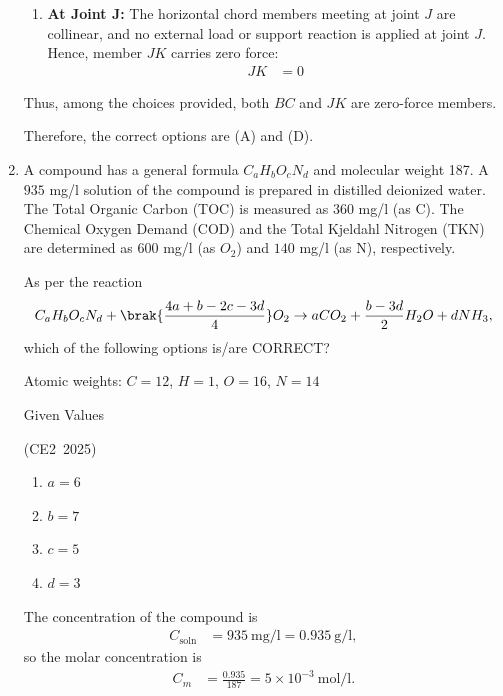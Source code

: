 \begin{enumerate}[label=\thesubsection.\arabic*, ref=\thesubsection.\theenumi,itemsep=0pt]
\begin{enumerate}
    \item \textbf{At Joint J:} The horizontal chord members meeting at joint $J$ are collinear, and no external load or support reaction is applied at joint $J$. Hence, member $JK$ carries zero force:
    \begin{align}
    JK &= 0
    \end{align}
\end{enumerate}

Thus, among the choices provided, both $BC$ and $JK$ are zero-force members.

Therefore, the correct options are (A) and (D).


\item
A compound has a general formula \(C_aH_bO_cN_d\) and molecular weight 187.
A \(935\) mg/l solution of the compound is prepared in distilled deionized water.
The Total Organic Carbon (TOC) is measured as \(360\) mg/l (as C). The Chemical
Oxygen Demand (COD) and the Total Kjeldahl Nitrogen (TKN) are determined as
\(600\) mg/l (as \(O_2\)) and \(140\) mg/l (as N), respectively.

As per the reaction
\begin{align}
C_aH_bO_cN_d+
\brak{\frac{4a+b-2c-3d}{4}}O_2
\rightarrow
aCO_2+\frac{b-3d}{2}H_2O+dNH_3,
\end{align}
which of the following options is/are CORRECT?

Atomic weights: $C=12$, $H=1$, $O=16$, $N=14$
\setcounter{table}{0}
\begin{table}[H]
	\centering
	
	\caption{Given Values}
	\label{tab:Given_values}
\end{table}

\hfill (CE2~2025)

\begin{multicols}{4}\begin{enumerate}
    \item \(a=6\)
    \item \(b=7\)
    \item \(c=5\)
    \item \(d=3\)
\end{enumerate}\end{multicols}

\solution
The concentration of the compound is
\begin{align}
C_{\mathrm{soln}}
&=935\ \text{mg/l}=0.935\ \text{g/l},
\end{align}
so the molar concentration is
\begin{align}
C_m
&=\frac{0.935}{187}=5\times10^{-3}\ \text{mol/l}.
\end{align}


\end{enumerate}
